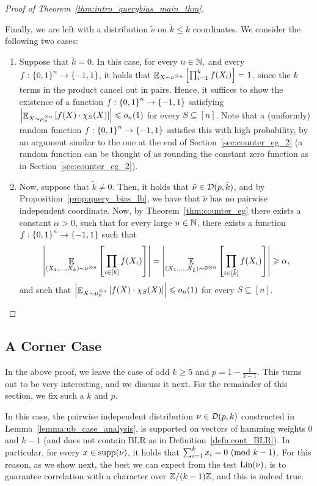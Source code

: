 \begin{proof}[Proof of Theorem~\ref{thm:intro_querybias_main_thm}]
\begin{enumerate}
		Finally, we are left with a distribution $\tilde{\nu}$ on $\tilde{k}\leq k$ coordinates.		
		We consider the following two cases:
		\begin{enumerate}
			\item Suppose that $\tilde{k}=0$. In this case, for every $n\in \mathbb{N},$ and every $f:\left\{ 0,1 \right\}^n\to \left\{ -1,1 \right\}$, it holds that $\mathop{\mathbb{E}}_{X\sim \nu^{\otimes n}} \left[ \prod_{i=1}^kf(X_i) \right] = 1$, since the $k$ terms in the product cancel out in pairs.
			Hence, it suffices to show the existence of a function $f:\left\{ 0,1 \right\}^n\to \left\{ -1,1 \right\}$ satisfying $\left|\mathop{\mathbb{E}}_{X\sim \mu_p^{\otimes n}}\left[ f(X)\cdot \chi_S(X) \right]\right| \leqslant o_n(1)$ for every $S\subseteq [n]$.
			Note that a (uniformly) random function $f:\left\{ 0,1 \right\}^n\to \left\{ -1,1 \right\}$ satisfies this with high probability, by an argument similar to the one at the end of Section~\ref{sec:counter_eg_2} (a random function can be thought of as rounding the constant zero function as in Section~\ref{sec:counter_eg_2}).
			
			\item Now, suppose that $\tilde{k}\not=0$. 
			Then, it holds that $\tilde{\nu} \in \mathcal D(p,\tilde{k})$, and by Proposition~\ref{prop:query_bias_lb}, we have that $\tilde{\nu}$ has no pairwise independent coordinate.
			Now, by Theorem~\ref{thm:counter_eg} there exists a constant $\alpha>0$, such that for every large $n\in \mathbb{N}$, there exists a function $f:\left\{ 0,1 \right\}^n\to \left\{ -1,1 \right\}$ such that \[ \left|\mathop{\mathbb{E}}_{(X_1,\dots,X_k)\sim \nu^{\otimes n}} \left[ \prod_{i\in [k]} f(X_i) \right] \right| = \left|\mathop{\mathbb{E}}_{(X_1,\dots,X_{\tilde{k}})\sim \tilde{\nu}^{\otimes n}} \left[ \prod_{i\in [\tilde{k}]} f(X_i) \right] \right|\geqslant \alpha,\]
			and such that $ \left|\mathop{\mathbb{E}}_{X\sim \mu_p^{\otimes n}}\left[ f(X)\cdot \chi_S(X) \right]\right| \leqslant o_n(1)$ for every $S\subseteq [n]$. \qedhere
			\end{enumerate}
\end{enumerate}
\end{proof}

\subsection{A Corner Case}\label{sec:corner_case}

In the above proof, we leave the case of odd $k\geq 5$ and $p=1-\frac{1}{k-1}$.
This turns out to be very interesting, and we discuss it next.
For the remainder of this section, we fix such a $k$ and $p$.

In this case, the pairwise independent distribution $\nu\in \mathcal D(p,k)$ constructed in Lemma~\ref{lemma:ub_case_analysis}, is supported on vectors of hamming weights 0 and $k-1$ (and does not contain BLR as in Definition~\ref{defn:cont_BLR}).
In particular, for every $x\in \textnormal{supp}(\nu)$, it holds that $\sum_{i=1}^k x_i = 0 \textnormal{ (mod $k-1$)}$.
For this reason, as we show next, the best we can expect from the test $\textnormal{Lin}(\nu)$, is to guarantee correlation with a character over $\mathbb{Z}/(k-1)\mathbb{Z}$, and this is indeed true.

